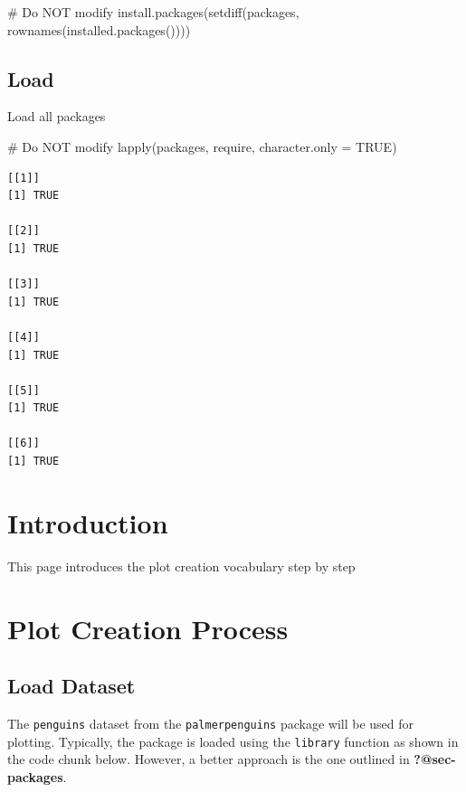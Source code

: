 \documentclass[
  letterpaper,
  DIV=11,
  numbers=noendperiod]{scrreprt}
\newenvironment{Shaded}{\begin{snugshade}}{\end{snugshade}}
\newcommand{\AttributeTok}[1]{\textcolor[rgb]{0.40,0.45,0.13}{#1}}
\newcommand{\CommentTok}[1]{\textcolor[rgb]{0.37,0.37,0.37}{#1}}
\newcommand{\ConstantTok}[1]{\textcolor[rgb]{0.56,0.35,0.01}{#1}}
\newcommand{\FunctionTok}[1]{\textcolor[rgb]{0.28,0.35,0.67}{#1}}
\newcommand{\NormalTok}[1]{\textcolor[rgb]{0.00,0.23,0.31}{#1}}
\begin{document}
\begin{Shaded}
\begin{Highlighting}[]
\CommentTok{\# Do NOT modify}
\FunctionTok{install.packages}\NormalTok{(}\FunctionTok{setdiff}\NormalTok{(packages, }\FunctionTok{rownames}\NormalTok{(}\FunctionTok{installed.packages}\NormalTok{())))}
\end{Highlighting}
\end{Shaded}

\subsection*{Load}\label{load-3}

Load all packages

\begin{Shaded}
\begin{Highlighting}[]
\CommentTok{\# Do NOT modify}
\FunctionTok{lapply}\NormalTok{(packages, require, }\AttributeTok{character.only =} \ConstantTok{TRUE}\NormalTok{)}
\end{Highlighting}
\end{Shaded}

\begin{verbatim}
[[1]]
[1] TRUE

[[2]]
[1] TRUE

[[3]]
[1] TRUE

[[4]]
[1] TRUE

[[5]]
[1] TRUE

[[6]]
[1] TRUE
\end{verbatim}

\section{Introduction}\label{introduction}

This page introduces the plot creation vocabulary step by step

\section{Plot Creation Process}\label{plot-creation-process}

\subsection{Load Dataset}\label{load-dataset}

The \texttt{penguins} dataset from the \texttt{palmerpenguins} package
will be used for plotting. Typically, the package is loaded using the
\texttt{library} function as shown in the code chunk below. However, a
better approach is the one outlined in \textbf{?@sec-packages}.
\end{document}
